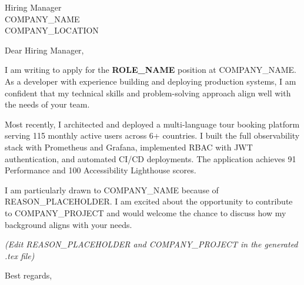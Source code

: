 \documentclass[11pt]{letter}
\begin{document}
\begin{letter}{Hiring Manager \\ COMPANY_NAME \\ COMPANY_LOCATION}
\opening{Dear Hiring Manager,}

I am writing to apply for the \textbf{ROLE_NAME} position at COMPANY_NAME. As a developer with experience building and deploying production systems, I am confident that my technical skills and problem-solving approach align well with the needs of your team.

Most recently, I architected and deployed a multi-language tour booking platform serving 115 monthly active users across 6+ countries. I built the full observability stack with Prometheus and Grafana, implemented RBAC with JWT authentication, and automated CI/CD deployments. The application achieves 91 Performance and 100 Accessibility Lighthouse scores.

I am particularly drawn to COMPANY_NAME because of REASON\_PLACEHOLDER. I am excited about the opportunity to contribute to COMPANY\_PROJECT and would welcome the chance to discuss how my background aligns with your needs.

\textit{(Edit REASON\_PLACEHOLDER and COMPANY\_PROJECT in the generated .tex file)}

\closing{Best regards,}

\end{letter}
\end{document}

